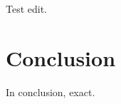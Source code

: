 \documentclass[preprint,12pt]{elsarticle}
\begin{document}
Test edit.


\section{Conclusion}
In conclusion, exact.














\end{document}
